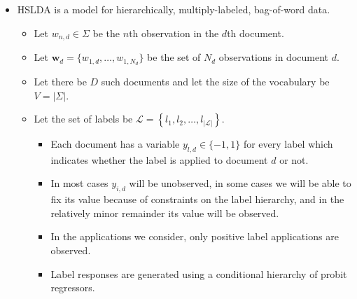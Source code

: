 \documentclass[portrait]{sciposter}
\begin{document}
\begin{multicols}{3}
\begin{itemize}
\item HSLDA is a model for hierarchically, multiply-labeled, bag-of-word data.

\begin{itemize}
\item Let $w_{n,d} \in \Sigma$ be the $n$th observation in the $d$th document.  
\item Let $\mathbf{w}_d = \{w_{1,d},\ldots,w_{1,N_d}\}$ be the  set of $N_d$ observations in document $d$.  
\item Let there be $D$ such documents and let the size of the vocabulary be $V=|\Sigma|$.  
\item Let the set of labels be $\mathcal{L}=\left\{  l_{1},l_{2},\ldots,l_{\left|\mathcal{L}\right|}\right\} $. 
\begin{itemize}
\item Each document has a variable $y_{l,d} \in \{-1,1\}$ for every label which indicates whether the label is applied to document $d$ or not.   
\item In most cases $y_{i,d}$ will be unobserved, in some cases we will be able to fix its value because of  constraints on the label hierarchy, and in the relatively minor remainder its value will be observed.  
\item In the applications we consider, only positive label applications are observed.  
\item Label responses are generated using a conditional hierarchy of probit regressors\cite{gelmanbda04}.

\end{itemize}
\end{itemize}
\end{itemize}





\end{multicols}
\end{document}
